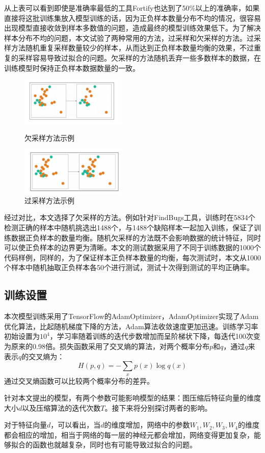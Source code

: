 从上表可以看到即使是准确率最低的工具Fortify也达到了50\%以上的准确率，如果直接将这批训练集放入模型训练的话，因为正负样本数量分布不均的情况，很容易出现模型直接收敛到样本多数值的问题，造成最终的模型训练效果低下。为了解决样本分布不均的问题，本文试验了两种常用的方法，过采样和欠采样的方法。过采样方法随机重复采样数量较少的样本，从而达到正负样本数量均衡的效果，不过重复的采样容易导致过拟合的问题。欠采样的方法随机丢弃一些多数样本的数据，在训练模型时保持正负样本数据数量的一致。
\begin{figure}[h]
\parbox[h]{.5\textwidth}{\centering
\includegraphics[width=0.45\textwidth]{figures/7.pdf}
\caption{欠采样方法示例}}
\parbox[h]{.5\textwidth}{\centering
\includegraphics[width=0.45\textwidth]{figures/8.pdf}
\caption{过采样方法示例}}
\end{figure}

经过对比，本文选择了欠采样的方法。例如针对FindBugs工具，训练时在5834个检测正确的样本中随机挑选出1488个，与1488个缺陷样本一起加入训练，保证了训练数据正负样本的数量均衡。随机欠采样的方法既不会影响数据的统计特征，同时可以使正负样本的边界更为清晰。本文的测试数据采用了不同于训练数据的1000个代码样例，同样的，为了保证样本正负样本数量的均衡，每次测试时，本文从1000个样本中随机抽取正负样本各50个进行测试，测试十次得到测试的平均正确率。

\subsection{训练设置}
本次模型训练采用了TensorFlow的AdamOptimizer，AdamOptimizer实现了Adam优化算法，比起随机梯度下降的方法，Adam算法收敛速度更加迅速。训练学习率初始设置为$10^{4}$，学习率随着训练的迭代步数增加而呈阶梯状下降，每迭代100次变为原来的0.98倍。损失函数采用了交叉熵的算法，对两个概率分布$p$和$q$，通过$q$来表示$q$的交叉熵为：
$$H(p,q) = -\sum_x p(x)\log q(x)$$
通过交叉熵函数可以比较两个概率分布的差异。

针对本文提出的模型，有两个参数可能影响模型的结果：图压缩后特征向量的维度大小$d$以及压缩算法的迭代次数$T$。接下来将分别探讨两者的影响。


对于特征向量$d$，可以看出，当$d$的维度增加，网络中的参数$W_1, W_2, W_3, W_4$的维度都会相应的增加，相当于网络的每一层的神经元都会增加，网络变得更加复杂，能够拟合的函数也就越复杂，同时也有可能导致过拟合的问题。
